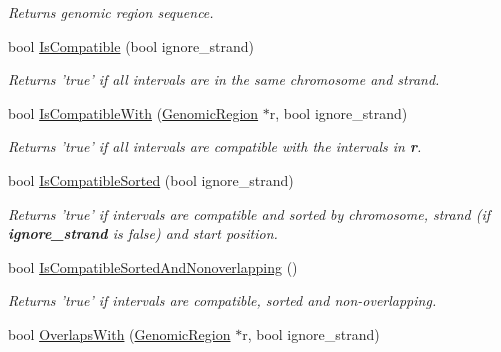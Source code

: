 \begin{DoxyCompactItemize}
\begin{DoxyCompactList}\small\item\em Returns genomic region sequence. \end{DoxyCompactList}\item 
\hypertarget{classGenomicRegion_a58c2fe162c1e9bbbd7c90d5abd011ff0}{
bool \hyperlink{classGenomicRegion_a58c2fe162c1e9bbbd7c90d5abd011ff0}{IsCompatible} (bool ignore\_\-strand)}
\label{classGenomicRegion_a58c2fe162c1e9bbbd7c90d5abd011ff0}

\begin{DoxyCompactList}\small\item\em Returns 'true' if all intervals are in the same chromosome and strand. \end{DoxyCompactList}\item 
\hypertarget{classGenomicRegion_a2ebd984a2632314a39a6e9ba2c497105}{
bool \hyperlink{classGenomicRegion_a2ebd984a2632314a39a6e9ba2c497105}{IsCompatibleWith} (\hyperlink{classGenomicRegion}{GenomicRegion} $\ast$r, bool ignore\_\-strand)}
\label{classGenomicRegion_a2ebd984a2632314a39a6e9ba2c497105}

\begin{DoxyCompactList}\small\item\em Returns 'true' if all intervals are compatible with the intervals in {\bfseries r}. \end{DoxyCompactList}\item 
\hypertarget{classGenomicRegion_a2e0765dfbe651ad583faa8c8a77e047f}{
bool \hyperlink{classGenomicRegion_a2e0765dfbe651ad583faa8c8a77e047f}{IsCompatibleSorted} (bool ignore\_\-strand)}
\label{classGenomicRegion_a2e0765dfbe651ad583faa8c8a77e047f}

\begin{DoxyCompactList}\small\item\em Returns 'true' if intervals are compatible and sorted by chromosome, strand (if {\bfseries ignore\_\-strand} is false) and start position. \end{DoxyCompactList}\item 
\hypertarget{classGenomicRegion_afb2db74a3cd85a84533375483e12b96c}{
bool \hyperlink{classGenomicRegion_afb2db74a3cd85a84533375483e12b96c}{IsCompatibleSortedAndNonoverlapping} ()}
\label{classGenomicRegion_afb2db74a3cd85a84533375483e12b96c}

\begin{DoxyCompactList}\small\item\em Returns 'true' if intervals are compatible, sorted and non-\/overlapping. \end{DoxyCompactList}\item 
\hypertarget{classGenomicRegion_a9e3617a0046fe5fa8fce9f9cce8c3c37}{
bool \hyperlink{classGenomicRegion_a9e3617a0046fe5fa8fce9f9cce8c3c37}{OverlapsWith} (\hyperlink{classGenomicRegion}{GenomicRegion} $\ast$r, bool ignore\_\-strand)}
\label{classGenomicRegion_a9e3617a0046fe5fa8fce9f9cce8c3c37}


\end{DoxyCompactItemize}
